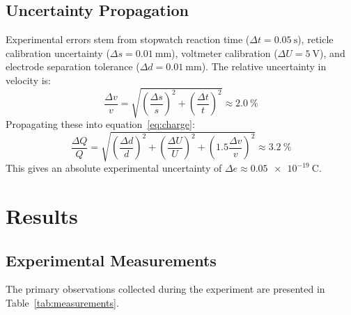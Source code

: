 \documentclass[journal]{IEEEtran}
\begin{document}
\subsection{Uncertainty Propagation}
Experimental errors stem from stopwatch reaction time ($\Delta t = \SI{0.05}{\second}$), reticle calibration uncertainty ($\Delta s = \SI{0.01}{\milli\meter}$), voltmeter calibration ($\Delta U = \SI{5}{\volt}$), and electrode separation tolerance ($\Delta d = \SI{0.01}{\milli\meter}$). 
The relative uncertainty in velocity is:
\begin{equation}
    \frac{\Delta v}{v} = \sqrt{\left(\frac{\Delta s}{s}\right)^2 + \left(\frac{\Delta t}{t}\right)^2} \approx \SI{2.0}{\percent}
\end{equation}
Propagating these into equation~\eqref{eq:charge}:
\begin{equation}
    \frac{\Delta Q}{Q} = \sqrt{\left(\frac{\Delta d}{d}\right)^2 + \left(\frac{\Delta U}{U}\right)^2 + \left(1.5 \frac{\Delta v}{v}\right)^2} \approx \SI{3.2}{\percent}
\end{equation}
This gives an absolute experimental uncertainty of $\Delta e \approx \SI{0.05e-19}{\coulomb}$.

\section{Results}

\subsection{Experimental Measurements}
The primary observations collected during the experiment are presented in Table~\ref{tab:measurements}.

\begin{table}[H]
    \centering
    \caption{Measured Droplet Ascent and Descent Times at Various Voltages}
    \label{tab:measurements}
\end{table}
\end{document}
